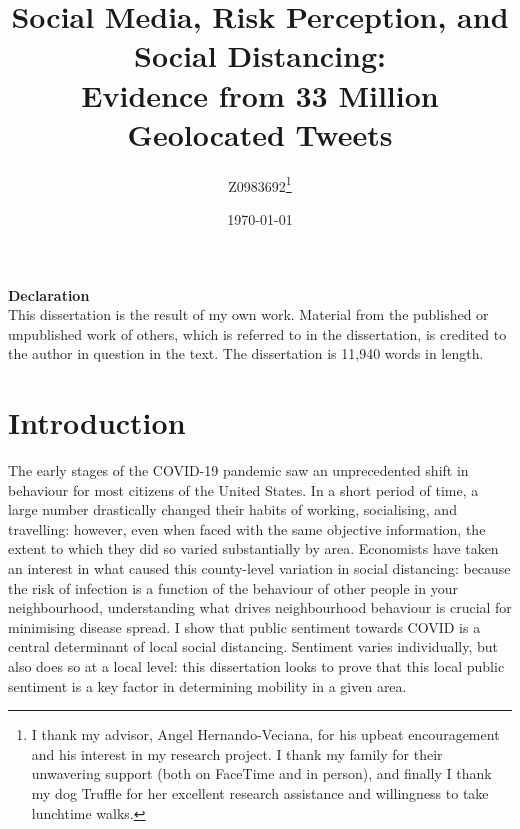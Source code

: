 \documentclass[12pt,a4]{article}
\author{Z0983692\thanks{I thank my advisor, Angel Hernando-Veciana, for his upbeat encouragement and his interest in my research project. I thank my family for their unwavering support (both on FaceTime and in person), and finally I thank my dog Truffle for her excellent research assistance and willingness to take lunchtime walks.}}
\date{\today}
\begin{document}
\title{Social Media, Risk Perception, and Social Distancing: \\ Evidence from 33 Million Geolocated Tweets}

\maketitle
\bigskip
\begin{center}
\textbf{Declaration} \\
This dissertation is the result of my own work. Material from the published or unpublished
work of others, which is referred to in the dissertation, is credited to the author in question in
the text. The dissertation is 11,940 words in length.
\end{center}
\newpage
\begin{onehalfspace}
\tableofcontents
\listoffigures
\listoftables
\end{onehalfspace}
\newpage
\section{Introduction}\label{overview}

The early stages of the COVID-19 pandemic saw an unprecedented shift in behaviour for most citizens of the United States. In a short period of time, a large number drastically changed their habits of working, socialising, and travelling: however, even when faced with the same objective information, the extent to which they did so varied substantially by area. Economists have taken an interest in what caused this county-level variation in social distancing: because the risk of infection is a function of the behaviour of other people in your neighbourhood, understanding what drives neighbourhood behaviour is crucial for minimising disease spread. I show that public sentiment towards COVID is a central determinant of local social distancing. Sentiment varies individually, but also does so at a local level: this dissertation looks to prove that this local public sentiment is a key factor in determining mobility in a given area. 
\end{document}
